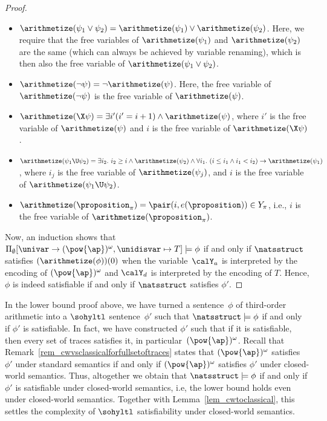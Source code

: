 \begin{proof}
\begin{itemize}
    \item $\arithmetize(\psi_1 \vee \psi_2) = \arithmetize(\psi_1) \vee \arithmetize(\psi_2)$. Here, we require that the free variables of $\arithmetize(\psi_1)$ and $\arithmetize(\psi_2)$ are the same (which can always be achieved by variable renaming), which is then also the free variable of $\arithmetize(\psi_1 \vee \psi_2)$.
    
    \item $\arithmetize(\neg\psi) = \neg\arithmetize(\psi)$. Here, the free variable of $\arithmetize(\neg\psi) $ is the free variable of $ \arithmetize(\psi)$.
    
     \item $\arithmetize(\X\psi) =  \exists i' (i' = i+1) \wedge \arithmetize(\psi)$, where $i'$ is the free variable of $\arithmetize(\psi)$ and $i$ is the free variable of $\arithmetize(\X\psi)$.
    
    \item $\arithmetize(\psi_1\U\psi_2) =  \exists i_2.\ i_2 \ge i \wedge \arithmetize(\psi_2) \wedge \forall i_1.\ (i \le i_1 \wedge i_1 < i_2) \rightarrow \arithmetize(\psi_1)$, where $i_j$ is the free variable of $\arithmetize(\psi_j)$, %
    and $i$ is the free variable of $\arithmetize(\psi_1\U\psi_2)$.

    \item $\arithmetize(\proposition_\pi) = \pair(i,e(\proposition)) \in Y_\pi$, i.e., $i$ is the free variable of $\arithmetize(\proposition_\pi)$.
    
\end{itemize}
Now, an induction shows that $\Pi_\emptyset[\univar\rightarrow (\pow{\ap})^\omega, \unidisvar \mapsto T] \models \phi$ if and only if $\natsstruct$ satisfies $(\arithmetize(\phi))(0)$ when the variable~$\calY_a$ is interpreted by the encoding of $(\pow{\ap})^\omega$ and $\calY_d$ is interpreted by the encoding of $T$.
Hence, $\phi$ is indeed satisfiable if and only if $\natsstruct$ satisfies $\phi'$.
\end{proof}

In the lower bound proof above, we have turned a sentence~$\phi$ of third-order arithmetic into a $\sohyltl$ sentence~$\phi'$ such that $\natsstruct\models\phi$  if and only if  $\phi'$ is satisfiable. 
In fact, we have constructed $\phi'$ such that if it is satisfiable, then every set of traces satisfies it, in particular~$(\pow{\ap})^\omega$.
Recall that Remark~\ref{rem_cwvsclassicalforfullsetoftraces} states that $(\pow{\ap})^\omega$ satisfies $\phi'$ under standard semantics if and only if $(\pow{\ap})^\omega$ satisfies $\phi'$ under closed-world semantics.
Thus, altogether we obtain that $\natsstruct\models\phi$  if and only if  $\phi'$ is satisfiable under closed-world semantics, i.e, the lower bound holds even under closed-world semantics.
Together with Lemma~\ref{lem_cwtoclassical}, this settles the complexity of $\sohyltl$ satisfiability under closed-world semantics.

